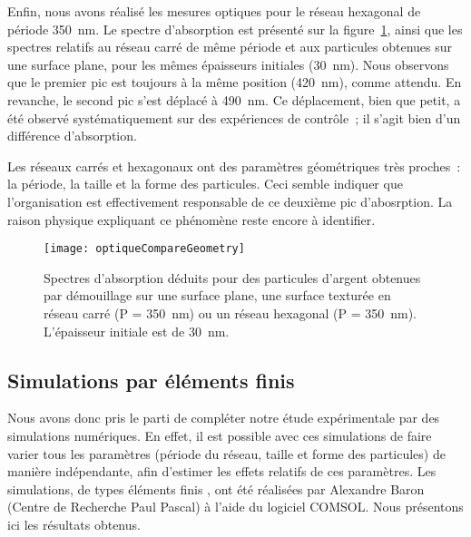 Enfin, nous avons réalisé les mesures optiques pour le réseau hexagonal de période 350~nm. Le spectre d'absorption est présenté sur la figure~\ref{optiqueCompareGeometry}, ainsi que les spectres relatifs au réseau carré de même période et aux particules obtenues sur une surface plane, pour les mêmes épaisseurs initiales (30~nm). Nous observons que le premier pic est toujours à la même position (420~nm), comme attendu. En revanche, le second pic s'est déplacé à 490~nm. Ce déplacement, bien que petit, a été observé systématiquement sur des expériences de contrôle~; il s'agit bien d'un différence d'absorption.\par 
Les réseaux carrés et hexagonaux ont des paramètres géométriques très proches~: la période, la taille et la forme des particules. Ceci semble indiquer que l'organisation est effectivement responsable de ce deuxième pic d'abosrption. La raison physique expliquant ce phénomène reste encore à identifier.\par 

\begin{figure}[!htb]
\centering
\texttt{[image: optiqueCompareGeometry]}
\caption{Spectres d'absorption déduits pour des particules d'argent obtenues par démouillage sur une surface plane, une surface texturée en réseau carré (P = 350~nm) ou un réseau hexagonal (P = 350~nm). L'épaisseur initiale est de 30~nm.}
\label{optiqueCompareGeometry}
\end{figure}

\subsection{Simulations par éléments finis}
Nous avons donc pris le parti de compléter notre étude expérimentale par des simulations numériques. En effet, il est possible avec ces simulations de faire varier tous les paramètres (période du réseau, taille et forme des particules) de manière indépendante, afin d'estimer les effets relatifs de ces paramètres. Les simulations, de types \og éléments finis \fg, ont été réalisées par Alexandre Baron (Centre de Recherche Paul Pascal) à l'aide du logiciel COMSOL. Nous présentons ici les résultats obtenus.\par 
